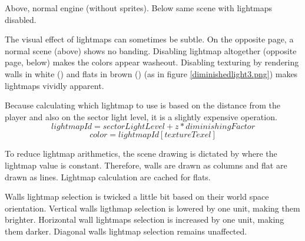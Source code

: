 
Above, normal engine (without sprites). Below same scene with lightmaps disabled.
\vspace{2mm}



\par
The visual effect of lightmaps can sometimes be subtle. On the opposite page, a normal scene (above) shows no banding. Disabling lightmap altogether (opposite page, below) makes the colors appear washeout. Disabling texturing by rendering walls in white () and flats in brown () (as in figure \ref{diminishedlight3.png}) makes lightmaps vividly apparent.\\
\par
Because calculating which lightmap to use is based on the distance from the player and also on the sector light level, it is a slightly expensive operation.\\
$$ lightmapId = sectorLightLevel + z * diminishingFactor $$
$$   color = lightmapId[textureTexel] $$
\par
 To reduce lightmap arithmetics, the scene drawing is dictated by where the lightmap value is constant. Therefore, walls are drawn as columns and flat are drawn as lines. Lightmap calculation are cached for flats.\\%
 \par
 Walls lightmap selection is twicked a little bit based on their world space orientation. Vertical walls ligthmap selection is lowered by one unit, making them brighter. Horizontal wall lightmaps selection is increased by one unit, making them darker. Diagonal walls lightmap selection remains unaffected.\\
\pagebreak


